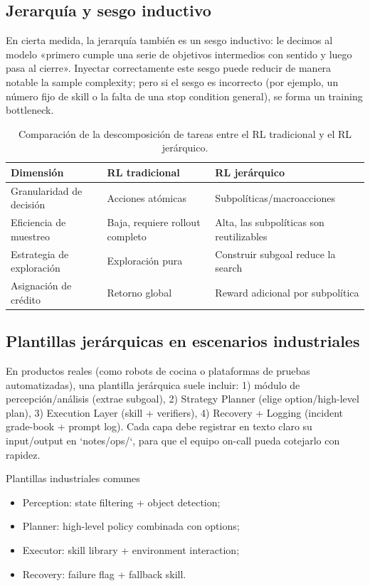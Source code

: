 \documentclass[a4paper]{article}
\begin{document}
\subsection{Jerarquía y sesgo inductivo}

En cierta medida, la jerarquía también es un sesgo inductivo: le decimos al modelo «primero cumple una serie de objetivos intermedios con sentido y luego pasa al cierre». Inyectar correctamente este sesgo puede reducir de manera notable la sample complexity; pero si el sesgo es incorrecto (por ejemplo, un número fijo de skill o la falta de una stop condition general), se forma un training bottleneck.

\begin{table}[H]
\centering
\begin{tabular}{p{4cm}p{5cm}p{3cm}}
\toprule
Dimensión & RL tradicional & RL jerárquico \\
\midrule
Granularidad de decisión & Acciones atómicas & Subpolíticas/macroacciones \\
Eficiencia de muestreo & Baja, requiere rollout completo & Alta, las subpolíticas son reutilizables \\
Estrategia de exploración & Exploración pura & Construir subgoal reduce la search \\
Asignación de crédito & Retorno global & Reward adicional por subpolítica \\
\bottomrule
\end{tabular}
\caption{Comparación de la descomposición de tareas entre el RL tradicional y el RL jerárquico.}
\end{table}

\subsection{Plantillas jerárquicas en escenarios industriales}

En productos reales (como robots de cocina o plataformas de pruebas automatizadas), una plantilla jerárquica suele incluir: 1) módulo de percepción/análisis (extrae subgoal), 2) Strategy Planner (elige option/high-level plan), 3) Execution Layer (skill + verifiers), 4) Recovery + Logging (incident grade-book + prompt log). Cada capa debe registrar en texto claro su input/output en `notes/ops/`, para que el equipo on-call pueda cotejarlo con rapidez.

\begin{knowledgebox}{Plantillas industriales comunes}
\begin{itemize}
    \item Perception: state filtering + object detection;
    \item Planner: high-level policy combinada con options;
    \item Executor: skill library + environment interaction;
    \item Recovery: failure flag + fallback skill.
\end{itemize}
\end{knowledgebox}
\end{document}
